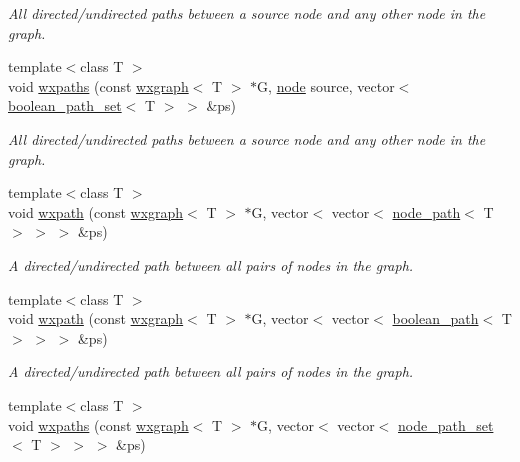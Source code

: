 \begin{DoxyCompactItemize}
\begin{DoxyCompactList}\small\item\em All directed/undirected paths between a source node and any other node in the graph. \end{DoxyCompactList}\item 
{\footnotesize template$<$class T $>$ }\\void \hyperlink{namespacelgraph_1_1traversal_a93c3d0fc761980ddfc4e8235279e9601}{wxpaths} (const \hyperlink{classlgraph_1_1utils_1_1wxgraph}{wxgraph}$<$ T $>$ $\ast$G, \hyperlink{namespacelgraph_1_1utils_ab9c6b34241f0b68372c55f34c460e863}{node} source, vector$<$ \hyperlink{namespacelgraph_1_1utils_aaf50131e15d771a45620336d6e7a77f8}{boolean\+\_\+path\+\_\+set}$<$ T $>$ $>$ \&ps)
\begin{DoxyCompactList}\small\item\em All directed/undirected paths between a source node and any other node in the graph. \end{DoxyCompactList}\item 
{\footnotesize template$<$class T $>$ }\\void \hyperlink{namespacelgraph_1_1traversal_a52e87298a02bf95e82074041bd459446}{wxpath} (const \hyperlink{classlgraph_1_1utils_1_1wxgraph}{wxgraph}$<$ T $>$ $\ast$G, vector$<$ vector$<$ \hyperlink{classlgraph_1_1utils_1_1node__path}{node\+\_\+path}$<$ T $>$ $>$ $>$ \&ps)
\begin{DoxyCompactList}\small\item\em A directed/undirected path between all pairs of nodes in the graph. \end{DoxyCompactList}\item 
{\footnotesize template$<$class T $>$ }\\void \hyperlink{namespacelgraph_1_1traversal_a69cf3d811b6f551c765d5a2cce69b3b2}{wxpath} (const \hyperlink{classlgraph_1_1utils_1_1wxgraph}{wxgraph}$<$ T $>$ $\ast$G, vector$<$ vector$<$ \hyperlink{classlgraph_1_1utils_1_1boolean__path}{boolean\+\_\+path}$<$ T $>$ $>$ $>$ \&ps)
\begin{DoxyCompactList}\small\item\em A directed/undirected path between all pairs of nodes in the graph. \end{DoxyCompactList}\item 
{\footnotesize template$<$class T $>$ }\\void \hyperlink{namespacelgraph_1_1traversal_a8901a21aa64dadd3483606b4c047e6a1}{wxpaths} (const \hyperlink{classlgraph_1_1utils_1_1wxgraph}{wxgraph}$<$ T $>$ $\ast$G, vector$<$ vector$<$ \hyperlink{namespacelgraph_1_1utils_a723c115f9865edfab11a90377b9abef4}{node\+\_\+path\+\_\+set}$<$ T $>$ $>$ $>$ \&ps)

\end{DoxyCompactItemize}

